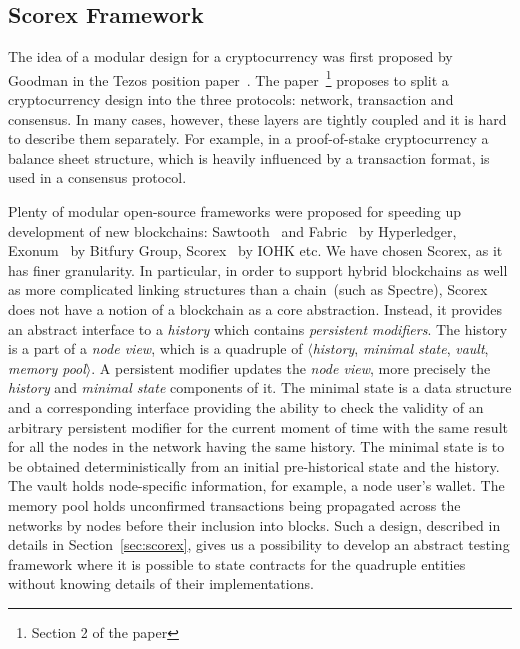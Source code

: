
\subsection{Scorex Framework}

The idea of a modular design for a cryptocurrency was first proposed by Goodman in the Tezos position paper~\cite{tezosPosition}. The paper~\footnote{Section 2 of the paper} proposes to split a cryptocurrency design into the three protocols: network, transaction and consensus. In many cases, however, these layers are tightly coupled and it is hard to describe them separately. For example, in a proof-of-stake cryptocurrency a balance sheet structure, which is heavily influenced by a transaction format, is used in a consensus protocol. 

Plenty of modular open-source frameworks were proposed for speeding up development of new blockchains: Sawtooth~\cite{sawtooth} and Fabric~\cite{fabric} by Hyperledger, Exonum~\cite{exonum} by Bitfury Group, Scorex~\cite{scorex} by IOHK etc. We have chosen Scorex, as it has finer granularity. In particular, in order to support hybrid blockchains as well as more complicated linking structures than a chain~(such as Spectre\cite{spectre}), Scorex does not have a notion of a blockchain as a core abstraction. Instead, it provides an abstract interface to a \textit{history} which contains \textit{persistent modifiers}. The history is a part of a \textit{node view}, which is a quadruple of $\langle$\textit{history}, \textit{minimal state}, \textit{vault}, \textit{memory pool}$\rangle$. A persistent modifier updates the \textit{node view}, more precisely the \textit{history} and \textit{minimal state} components of it. The minimal state is a data structure and a corresponding interface providing the ability to check the validity of an arbitrary persistent modifier for the current moment of time with the same result for all the nodes in the network having the same history. The minimal state is to be obtained deterministically from an initial pre-historical state and the history. The vault holds node-specific information, for example, a node user's wallet. The memory pool holds unconfirmed transactions being propagated across the networks by nodes before their inclusion into blocks. Such a design, described in details in Section~\ref{sec:scorex}, gives us a possibility to develop an abstract testing framework where it is possible to state contracts for the quadruple entities without knowing details of their implementations.